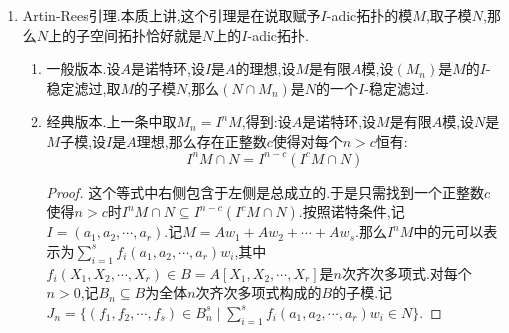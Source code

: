 \begin{enumerate}
\begin{enumerate}[(1)]
\begin{proof}
			先构造$n=1$,直接取$G_1,H_1\in A[X]$是$g,h$在$A[X]$中的首一的任意提升.下面假设以及构造了满足要求的$G_n,H_n$,其中$n\ge1$,特别的有$F-G_nH_n\equiv0\mod(m^n)$,于是可记$F-G_nH_n=\sum_{1\le i\le s}w_iU_i(X)$,其中$w_i\in m^n$并且$U_i\in A[X]$.这里$F-G_nH_n$的次数肯定严格小于$F$的次数,因为$F$是首一的,如果次数没变,这个差也是首一的,就和系数落在$m^n$矛盾.于是我们不妨约定对每个$i$总有$\deg U_i<\deg F$.按照$g,h$在$k[X]$中互素,于是可取$k[X]$中多项式$p_i,q_i$使得$\overline{U_i}=gp_i+hq_i$,并且这个分解中可不妨约定$\deg p_i<\deg h$和$\deg q_i<\deg g$.取提升多项式$P_i,Q_i\in A[X]$使得$\overline{P_i}=p_i$和$\overline{Q_i}=q_i$,并且约定$\deg P_i=\deg p_i$和$\deg Q_i=\deg q_i$.于是有:
			$$F-G_nH_n\equiv\sum_{1\le i\le s}w_i(G_nP_i+H_nQ_i)(\mod m^{n+1})$$
			$$F-(G_n+\sum_iw_iQ_i)(H_n+\sum_iw_iP_i)\equiv0(\mod m^{n+1})$$
			
			取$G_{n+1}=G_n+\sum_iw_iQ_i$和$H_{n+1}=H_n+\sum_iw_iP_i$.按照$\deg Q_i<\deg g=\deg G_n$得到$G_{n+1}$是首一的多项式,同理$H_{n+1}$也是首一的多项式.另外按照$w_i\in m^n$得到$G_{n+1}\equiv G_n(\mod m^n)$和$H_{n+1}\equiv H_n(\mod m^n)$,这就完成构造.
		\end{proof}
		\item 推论.设$(A,m,k)$是$m$-adic完备的局部环,设$F(X)\in A[X]$是首一的多项式,设$\overline{F}(X)$是$F(X)$在$k[X]$中的像,如果$\overline{F}(X)$在$k$上有一个单重根$\lambda$,那么$F(X)$在$A$中存在一个单重根$a$,满足$\overline{a}=\lambda$.
	\end{enumerate}
    \item Artin-Rees引理.本质上讲,这个引理是在说取赋予$I$-adic拓扑的模$M$,取子模$N$,那么$N$上的子空间拓扑恰好就是$N$上的$I$-adic拓扑.
    \begin{enumerate}[(1)]
    	\item 一般版本.设$A$是诺特环,设$I$是$A$的理想,设$M$是有限$A$模,设$(M_n)$是$M$的$I$-稳定滤过,取$M$的子模$N$,那么$(N\cap M_n)$是$N$的一个$I$-稳定滤过.
    	\item 经典版本.上一条中取$M_n=I^nM$,得到:设$A$是诺特环,设$M$是有限$A$模,设$N$是$M$子模,设$I$是$A$理想,那么存在正整数$c$使得对每个$n>c$恒有:
    	$$I^nM\cap N=I^{n-c}(I^cM\cap N)$$
    	\begin{proof}
    		
    		这个等式中右侧包含于左侧是总成立的.于是只需找到一个正整数$c$使得$n>c$时$I^nM\cap N\subseteq I^{n-c}(I^cM\cap N)$.按照诺特条件,记$I=(a_1,a_2,\cdots,a_r)$.记$M=Aw_1+Aw_2+\cdots+Aw_s$.那么$I^nM$中的元可以表示为$\sum_{i=1}^sf_i(a_1,a_2,\cdots,a_r)w_i$,其中$f_i(X_1,X_2,\cdots,X_r)\in B=A[X_1,X_2,\cdots,X_r]$是$n$次齐次多项式.对每个$n>0$,记$B_n\subseteq B$为全体$n$次齐次多项式构成的$B$的子模.记$J_n=\{(f_1,f_2,\cdots,f_s)\in B_n^s\mid \sum_{i=1}^sf_i(a_1,a_2,\cdots,a_r)w_i\in N\}$.
    		

\end{proof}
\end{enumerate}
\end{enumerate}
